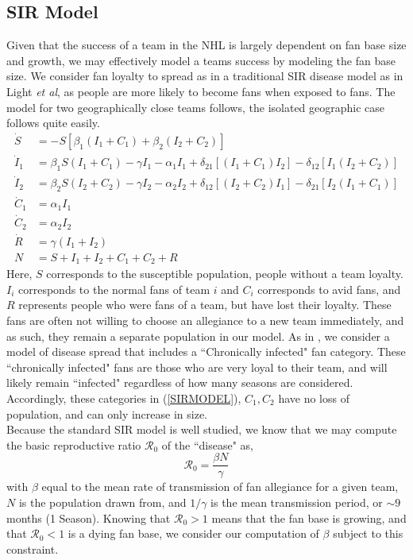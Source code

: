 \documentclass[11pt]{report}            %
\newcommand{\ro}{\mathcal{R}_0}
\begin{document}
\subsection*{SIR Model}
Given that the success of a team in the NHL is largely dependent on fan base size and growth, we may effectively model a teams success by modeling the fan base size. We consider fan loyalty to spread as in a traditional SIR disease model as in Light \textit{et al}\cite{light}, as people are more likely to become fans when exposed to fans. The model for two geographically close teams follows, the isolated geographic case follows quite easily.
\begin{equation} \label{SIRMODEL}
\begin{split}
\dot{S} &= -S[\beta_1(I_1+C_1)+\beta_2(I_2+C_2)]\\
\dot{I}_1 &= \beta_1S(I_1+C_1)-\gamma I_1-\alpha_1I_1+\delta_{21}[(I_1+C_1)I_2]-\delta_{12}[I_1(I_2+C_2)]\\
\dot{I}_2 &= \beta_2S(I_2+C_2)-\gamma I_2-\alpha_2I_2+\delta_{12}[(I_2+C_2)I_1]-\delta_{21}[I_2(I_1+C_1)]\\
\dot{C}_1 &= \alpha_1I_1\\
\dot{C}_2 &= \alpha_2I_2\\
\dot{R} &= \gamma (I_1+I_2)\\
N &= S+I_1+I_2+C_1+C_2+R
\end{split}
\end{equation}
Here, $S$ corresponds to the susceptible population, people without a team loyalty. $I_i$ corresponds to the normal fans of team $i$ and $C_i$ corresponds to avid fans, and $R$ represents people who were fans of a team, but have lost their loyalty. These fans are often not willing to choose an allegiance to a new team immediately, and as such, they remain a separate population in our model. As in \cite{light}, we consider a model of disease spread that includes a ``Chronically infected" fan category. These ``chronically infected" fans are those who are very loyal to their team, and will likely remain ``infected" regardless of how many seasons are considered. Accordingly, these categories in (\ref{SIRMODEL}), $C_1,C_2$ have no loss of population, and can only increase in size. \\
Because the standard SIR model is well studied, we know that we may compute the basic reproductive ratio $\ro$ of the ``disease" as,
\[\ro =\frac{\beta N}{\gamma}\]
with $\beta$ equal to the mean rate of transmission of fan allegiance for a given team, $N$ is the population drawn from, and $1/\gamma$ is the mean transmission period, or $\sim 9$ months (1 Season). Knowing that $\ro>1$ means that the fan base is growing, and that $\ro<1$ is a dying fan base, we consider our computation of $\beta$ subject to this constraint.
\end{document}
